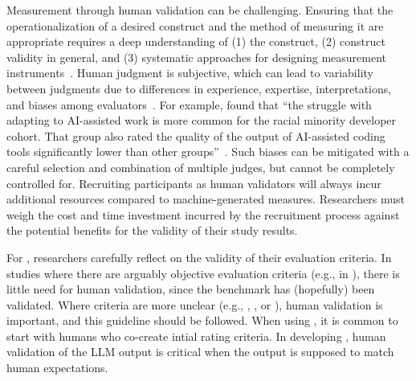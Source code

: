 
Measurement through human validation can be challenging.
Ensuring that the operationalization of a desired construct and the method of measuring it are appropriate requires a deep understanding of (1) the construct, (2) construct validity in general, and (3) systematic approaches for designing measurement instruments~\cite{DBLP:journals/tse/SjobergB23}.
Human judgment is subjective, which can lead to variability between judgments due to differences in experience, expertise, interpretations, and biases among evaluators~\cite{DBLP:journals/pacmhci/McDonaldSF19}.
For example, \citeauthor{hicks_lee_foster-marks_2025} found that \enquote{the struggle with adapting to AI-assisted work is more common for the racial minority developer cohort.
That group also rated the quality of the output of AI-assisted coding tools significantly lower than other groups}~\cite{hicks_lee_foster-marks_2025}.
Such biases can be mitigated with a careful selection and combination of multiple judges, but cannot be completely controlled for.
Recruiting participants as human validators will always incur additional resources compared to machine-generated measures.
Researchers must weigh the cost and time investment incurred by the recruitment process against the potential benefits for the validity of their study results.


For \llmusage, researchers \should carefully reflect on the validity of their evaluation criteria.
In studies where there are arguably objective evaluation criteria (e.g., in \benchmarkingtasks), there is little need for human validation, since the benchmark has (hopefully) been validated.
Where criteria are more unclear (e.g., \annotators, \subjects, or \synthesis), human validation is important, and this guideline should be followed.
When using \judges, it is common to start with humans who co-create intial rating criteria. 
In developing \newtools, human validation of the LLM output is critical when the output is supposed to match human expectations.

